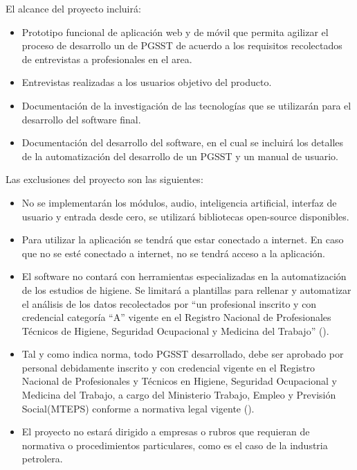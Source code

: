 \noindent
El alcance del proyecto incluirá:

\begin{itemize}
	\item Prototipo funcional de aplicación web y de móvil que permita agilizar el proceso de desarrollo un de PGSST de acuerdo a los requisitos recolectados de entrevistas a profesionales en el area.
	\item Entrevistas realizadas a los usuarios objetivo del producto.
	\item Documentación de la investigación de las tecnologías que se utilizarán para el
	desarrollo del software final.
	\item Documentación del desarrollo del software, en el cual se incluirá los detalles de la automatización del desarrollo de un PGSST y un manual de usuario.
\end{itemize}

\noindent
Las exclusiones del proyecto son las siguientes:
\begin{itemize}
	\item No se implementarán los módulos, audio, inteligencia artificial, interfaz de usuario y entrada desde cero, se utilizará bibliotecas open-source disponibles.
	\item Para utilizar la aplicación se tendrá que estar conectado a internet. En
	caso que no se esté conectado a internet, no se tendrá acceso a la
	aplicación.
	\item El software no contará con herramientas especializadas en la automatización de los estudios de higiene. Se limitará a plantillas para rellenar y automatizar el análisis de los datos recolectados por ``un profesional inscrito y con credencial categoría ``A'' vigente en el Registro Nacional de Profesionales Técnicos de Higiene, Seguridad Ocupacional y Medicina del Trabajo'' (\cite{NTS-009/23}).
	\item Tal y como indica norma, todo PGSST desarrollado, debe ser aprobado por personal debidamente inscrito y con credencial vigente en el Registro Nacional de Profesionales y Técnicos en Higiene, Seguridad Ocupacional y Medicina del Trabajo, a cargo del Ministerio Trabajo, Empleo y Previsión Social(MTEPS) conforme a normativa legal vigente (\cite{NTS-009/23}).
	\item El proyecto no estará dirigido a empresas o rubros que requieran de normativa o procedimientos particulares, como es el caso de la industria petrolera.
\end{itemize}
